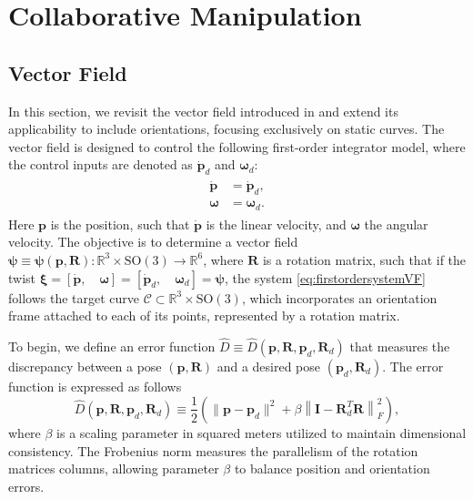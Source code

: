 \chapter{Collaborative Manipulation}\label{ch:collaborative}

\section{Vector Field}
In this section, we revisit the vector field introduced in \cite{Rezende2022} and extend its applicability to include orientations, focusing exclusively on static curves. The vector field is designed to control the following first-order integrator model, where the control inputs are denoted as $\dot{\mathbf{p}}_d$ and $\boldsymbol{\omega}_d$:
\begin{align}
\begin{split}
    \dot{\mathbf{p}} &= \dot{\mathbf{p}}_d,\\
    \boldsymbol{\omega} &= \boldsymbol{\omega}_d.\label{eq:firstordersystemVF}
\end{split} 
\end{align}
Here $\mathbf{p}$ is the position, such that $\dot{\mathbf{p}}$ is the linear velocity, and $\boldsymbol{\omega}$ the angular velocity. 
The objective is to determine a vector field $\boldsymbol{\psi}\equiv\boldsymbol{\psi}(\mathbf{p}, \mathbf{R}):\mathbb{R}^3 \times \text{SO}(3)\to\mathbb{R}^6$, where $\mathbf{R}$ is a rotation matrix, such that if the twist $\boldsymbol{\xi} = \left[\dot{\mathbf{p}},\quad \boldsymbol{\omega} \right]= \left[\dot{\mathbf{p}}_d,\quad \boldsymbol{\omega}_d \right] = \boldsymbol{\psi}$, the system \eqref{eq:firstordersystemVF} follows the target curve $\mathcal{C} \subset \mathbb{R}^3\times \text{SO}(3)$, which incorporates an orientation frame attached to each of its points, represented by a rotation matrix.

To begin, we define an error function $\widehat{D}\equiv\widehat{D}(\mathbf{p}, \mathbf{R}, \mathbf{p}_d, \mathbf{R}_d)$ that measures the discrepancy between a pose $(\mathbf{p}, \mathbf{R})$ and a desired pose $(\mathbf{p}_d, \mathbf{R}_d)$. The error function is expressed as follows
\begin{equation}
    \widehat{D}(\mathbf{p}, \mathbf{R}, \mathbf{p}_d, \mathbf{R}_d) \equiv \frac{1}{2}\left(\|\mathbf{p} - \mathbf{p}_d\|^2 + \beta\left\|\mathbf{I} - \mathbf{R}_d^{T}\mathbf{R}\right\|^2_F\right),\! \label{eq:errorfuncDtilde}
\end{equation}
where $\beta$ is a scaling parameter in squared meters utilized to maintain dimensional consistency. The Frobenius norm measures the parallelism of the rotation matrices columns, allowing parameter $\beta$ to balance position and orientation errors.

